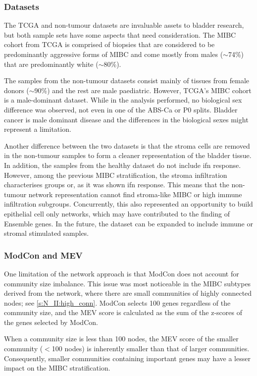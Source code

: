 \subsubsection*{Datasets}

The TCGA and non-tumour datasets are invaluable assets to bladder research, but both sample sets have some aspects that need consideration. The MIBC cohort from TCGA is comprised of biopsies that are considered to be predominantly aggressive forms of MIBC and come mostly from males (\(\sim\)74\%) that are predominantly white (\(\sim\)80\%).

The samples from the non-tumour datasets consist mainly of tissues from female donors (\(\sim\)90\%) and the rest are male paediatric. However, TCGA's MIBC cohort is a male-dominant dataset. While in the analysis performed, no biological sex difference was observed, not even in one of the ABS-Ca or P0 splits. Bladder cancer is male dominant disease and the differences in the biological sexes might represent a limitation.

Another difference between the two datasets is that the stroma cells are removed in the non-tumour samples to form a cleaner representation of the bladder tissue. In addition, the samples from the healthy dataset do not include \acrlong{ifn} response. However, among the previous MIBC stratification, the stroma infiltration characterises groups or, as it was shown \acrshort{ifn} response. This means that the non-tumour network representation cannot find stroma-like MIBC or high immune infiltration subgroups. Concurrently, this also represented an opportunity to build epithelial cell only networks, which may have contributed to the finding of Ensemble genes. In the future, the dataset can be expanded to include immune or stromal stimulated samples.

\subsubsection*{ModCon and MEV}

One limitation of the network approach is that ModCon does not account for community size imbalance. This issue was most noticeable in the MIBC subtypes derived from the network, where there are small communities of highly connected nodes; see \cref{s:N_II:high_conn}. ModCon selects 100 genes regardless of the community size, and the MEV score is calculated as the sum of the z-scores of the genes selected by ModCon.

When a community size is less than 100 nodes, the MEV score of the smaller community (\(<\)100 nodes) is inherently smaller than that of larger communities. Consequently, smaller communities containing important genes may have a lesser impact on the MIBC stratification.


